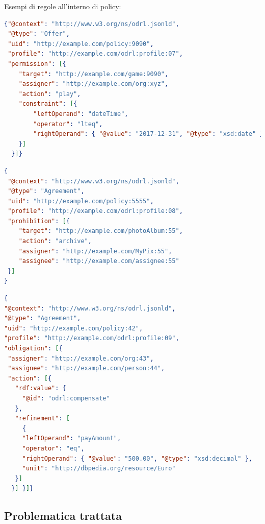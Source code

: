\documentclass[12pt,a4paper,twoside]{book}
\begin{document}
Esempi di regole all'interno di policy:
\begin{lstlisting}[language=json,firstnumber=1,caption={La regola esprime il permesso di eseguire l'azione \textbf{play} sul target fino al giorno 2017-12-31 compreso},captionpos=b,label=esempioPerm]
{"@context": "http://www.w3.org/ns/odrl.jsonld",
 "@type": "Offer",
 "uid": "http://example.com/policy:9090",
 "profile": "http://example.com/odrl:profile:07",
 "permission": [{
    "target": "http://example.com/game:9090",
    "assigner": "http://example.com/org:xyz",
    "action": "play",
    "constraint": [{
        "leftOperand": "dateTime",
        "operator": "lteq",
        "rightOperand": { "@value": "2017-12-31", "@type": "xsd:date" }
    }]
  }]}
\end{lstlisting}
\begin{lstlisting}[language=json,firstnumber=1,caption={La regola esprime il divieto di eseguire l'azione \textbf{archive} sul target},captionpos=b,label=esempioPro]
{
 "@context": "http://www.w3.org/ns/odrl.jsonld",
 "@type": "Agreement",
 "uid": "http://example.com/policy:5555",
 "profile": "http://example.com/odrl:profile:08",
 "prohibition": [{
	"target": "http://example.com/photoAlbum:55",
	"action": "archive",
	"assigner": "http://example.com/MyPix:55",
	"assignee": "http://example.com/assignee:55"
 }]
}
\end{lstlisting}

\begin{lstlisting}[language=json,firstnumber=1,caption={La regola esprime l'obbligo di eseguire l'azione \textbf{compensate}, specificando come \textbf{refinement} l'ammontare del pagamento},captionpos=b,label=esempioDuty]
{
"@context": "http://www.w3.org/ns/odrl.jsonld",
"@type": "Agreement",
"uid": "http://example.com/policy:42",
"profile": "http://example.com/odrl:profile:09",
"obligation": [{
 "assigner": "http://example.com/org:43",
 "assignee": "http://example.com/person:44",
 "action": [{
   "rdf:value": {
     "@id": "odrl:compensate"
   },
   "refinement": [
     {
     "leftOperand": "payAmount",
     "operator": "eq",
     "rightOperand": { "@value": "500.00", "@type": "xsd:decimal" },
     "unit": "http://dbpedia.org/resource/Euro"
   }]
  }] }]}
\end{lstlisting}
\label{problematicheSec}
\subsection{Problematica trattata}\label{problematiche}
\end{document}
